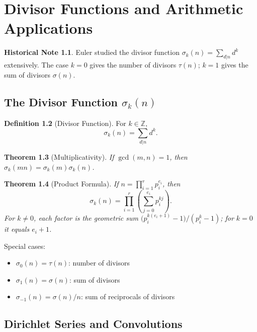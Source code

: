 \documentclass[11pt,a4paper,twoside]{book}
\theoremstyle{eulerstyle}
\newtheorem{theorem}{Theorem}[chapter]
\theoremstyle{definition}
\newtheorem{definition}[theorem]{Definition}
\newtheorem{historical}[theorem]{Historical Note}
\newcommand{\Z}{\mathbb{Z}}
\begin{document}
\cleardoublepage

\chapter{Divisor Functions and Arithmetic Applications}
\label{ch:divisors}

\begin{historical}
Euler studied the divisor function $\sigma_k(n) = \sum_{d|n} d^k$ extensively. The case $k=0$ gives the number of divisors $\tau(n)$; $k=1$ gives the sum of divisors $\sigma(n)$.
\end{historical}

\section{The Divisor Function $\sigma_k(n)$}

\begin{definition}[Divisor Function]
For $k \in \Z$,
\[
\sigma_k(n) = \sum_{d|n} d^k.
\]
\end{definition}

\begin{theorem}[Multiplicativity]
If $\gcd(m,n)=1$, then $\sigma_k(mn) = \sigma_k(m)\sigma_k(n)$.
\end{theorem}

\begin{theorem}[Product Formula]
If $n = \prod_{i=1}^r p_i^{e_i}$, then
\[
\sigma_k(n) = \prod_{i=1}^r \left(\sum_{j=0}^{e_i}p_i^{kj}\right).
\]
For $k\ne 0$, each factor is the geometric sum
$\bigl(p_i^{k(e_i+1)}-1\bigr)/(p_i^k-1)$; for $k=0$ it equals $e_i+1$.
\end{theorem}

Special cases:
\begin{itemize}
    \item $\sigma_0(n) = \tau(n)$: number of divisors
    \item $\sigma_1(n) = \sigma(n)$: sum of divisors
    \item $\sigma_{-1}(n) = \sigma(n)/n$: sum of reciprocals of divisors
\end{itemize}

\section{Dirichlet Series and Convolutions}
\end{document}
